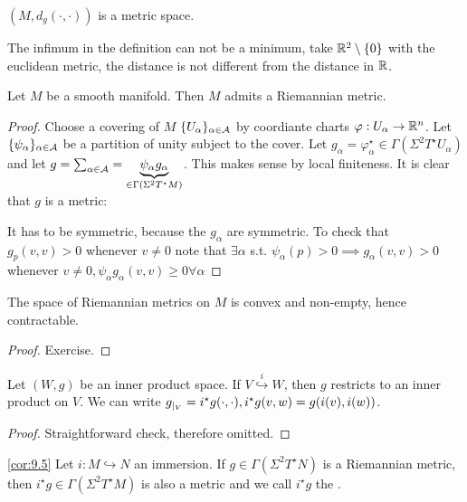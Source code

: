  \((M,d_g(\cdot,\cdot))\) is a metric space.

The infimum in the definition can not be a minimum, take \(\mathbb{R}^2\setminus \{0\}\) with the euclidean metric, the distance is not different from the distance in \(\mathbb{R}\).

\begin{lemma}\label{lem:9.2}
    Let \(M\) be a smooth manifold. Then \(M\) admits a Riemannian 
    metric.
\end{lemma}

\begin{proof}
    Choose a covering of \(M\) \(\{U_\alpha\}_{\alpha\in \mathcal{A}}\) by coordiante charts \(\varphi:U_\alpha\to \mathbb{R}^n\).
    Let \(\{\psi_\alpha\}_{\alpha\in \mathcal{A}}\) be a partition of unity subject to the cover.
    Let \(g_\alpha=\varphi_\alpha^\star\in\Gamma(\Sigma^2 T^\star U_\alpha)\) and let \(g=\sum_{\alpha\in\mathcal{A}}=\underbrace{\psi_\alpha g_\alpha}_{\in \Gamma(\Sigma^2T^\star M)}\).
    This makes sense by local finiteness. It is clear that \(g\) is a metric:

    It has to be symmetric, because the \(g_\alpha\) are symmetric. To check that \(g_p(v,v)> 0\)
    whenever \(v\neq 0\) note that \(\exists\alpha\) s.t. \(\psi_\alpha(p)>0\implies g_\alpha(v,v)>0\)
    whenever \(v\neq 0,\psi_\alpha g_\alpha(v,v)\geq 0\forall \alpha\)
\end{proof}

\begin{corollary}\label{lem:9.3}
    The space of Riemannian metrics on \(M\) is convex and non-empty, hence contractable.
\end{corollary}

\begin{proof}
    Exercise.
\end{proof}

\begin{lemma}\label{lem:9.4}
    Let \((W,g)\) be an inner product space. If \(V\stackrel{i}{\hookrightarrow} W\), then 
    \(g\) restricts to an inner product on \(V\). We can write \(g_{|_{V}}=i^\star g(\cdot,\cdot),i^\star g(v,w)=g(i(v),i(w))\).
\end{lemma}

\begin{proof}
    Straightforward check, therefore omitted.
\end{proof}

\begin{corollary}\ref{cor:9.5}
    Let \(i:M\hookrightarrow N\) an immersion. If \(g\in \Gamma(\Sigma^2T^\star N)\) is a 
    Riemannian metric, then \(i^\star g\in \Gamma(\Sigma^2 T^\star M)\) is also a metric and we call 
    \(i^\star g\) the . 
\end{corollary}

